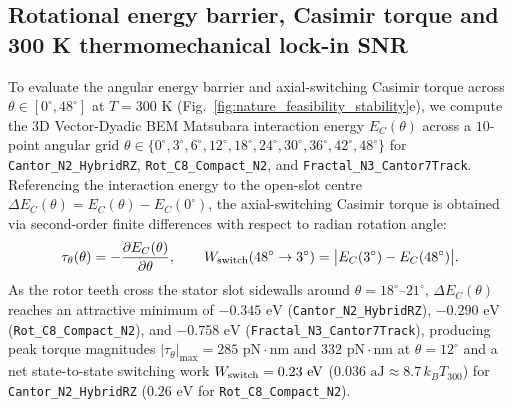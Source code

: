 \documentclass[pdflatex,sn-nature]{sn-jnl}
\begin{document}
\subsection*{Rotational energy barrier, Casimir torque and 300 K thermomechanical lock-in SNR}
To evaluate the angular energy barrier and axial-switching Casimir torque across $\theta \in [0^\circ, 48^\circ]$ at $T = 300\text{ K}$ (Fig.~\ref{fig:nature_feasibility_stability}e), we compute the 3D Vector-Dyadic BEM Matsubara interaction energy $E_C(\theta)$ across a $10$-point angular grid $\theta \in \{0^\circ, 3^\circ, 6^\circ, 12^\circ, 18^\circ, 24^\circ, 30^\circ, 36^\circ, 42^\circ, 48^\circ\}$ for \texttt{Cantor\_N2\_HybridRZ}, \texttt{Rot\_C8\_Compact\_N2}, and \texttt{Fractal\_N3\_Cantor7Track}. Referencing the interaction energy to the open-slot centre $\Delta E_C(\theta) = E_C(\theta) - E_C(0^\circ)$, the axial-switching Casimir torque is obtained via second-order finite differences with respect to radian rotation angle:
\begin{equation}
\tau_\theta(\theta) = -\frac{\partial E_C(\theta)}{\partial \theta}, \qquad
W_{\rm switch}(48^\circ \to 3^\circ) = \bigl|E_C(3^\circ) - E_C(48^\circ)\bigr|.
\label{eq:methods_rotational_torque}
\end{equation}
As the rotor teeth cross the stator slot sidewalls around $\theta = 18^\circ\text{--}21^\circ$, $\Delta E_C(\theta)$ reaches an attractive minimum of $-0.345\text{ eV}$ (\texttt{Cantor\_N2\_HybridRZ}), $-0.290\text{ eV}$ (\texttt{Rot\_C8\_Compact\_N2}), and $-0.758\text{ eV}$ (\texttt{Fractal\_N3\_Cantor7Track}), producing peak torque magnitudes $|\tau_\theta|_{\max} = 285\text{ pN}\cdot\text{nm}$ and $332\text{ pN}\cdot\text{nm}$ at $\theta = 12^\circ$ and a net state-to-state switching work $W_{\rm switch} = 0.23\text{ eV}$ ($0.036\text{ aJ} \approx 8.7\,k_B T_{300}$) for \texttt{Cantor\_N2\_HybridRZ} ($0.26\text{ eV}$ for \texttt{Rot\_C8\_Compact\_N2}).
\end{document}

